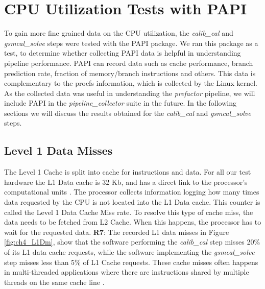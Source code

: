 \section{CPU Utilization Tests with PAPI}\label{sec:ch4_PAPI}

To gain more fine grained data on the CPU utilization, the \textit{calib\_cal} and \textit{gsmcal\_solve} steps were tested with the PAPI package.  We ran this package as a test, to determine whether collecting PAPI data is helpful in understanding pipeline performance.  PAPI can record data such as cache performance, branch prediction rate, fraction of memory/branch instructions and others. This data is complementary to the procfs information, which is collected by the Linux kernel. As the collected data was useful in understanding the \textit{prefactor} pipeline, we will include PAPI in the \textit{pipeline\_collector} suite in the future. In the following sections we will discuss the results obtained for the \textit{calib\_cal} and \textit{gsmcal\_solve} steps.

\subsection{Level 1 Data Misses}

The Level 1 Cache is split into cache for instructions and data. For all our test hardware the L1 Data cache is 32 Kb, and has a direct link to the processor's computational units \citep{haswell}. The processor collects information logging how many times data requested by the CPU is not located into the L1 Data cache. This counter is called the Level 1 Data Cache Miss rate. To resolve this type of cache miss, the data needs to be fetched from L2 Cache. When this happens, the processor has to wait for the requested data. \textbf{R7}: The recorded L1 data misses in Figure \ref{fig:ch4_L1Dm}, show that the software performing the \textit{calib\_cal} step  misses 20\% of its L1 data cache requests, while the software implementing the \textit{gsmcal\_solve} step misses less than 5\% of L1 Cache requests. These cache misses often happens in multi-threaded applications where there are instructions shared by multiple threads on the same cache line \citep{cache_opt}. 

